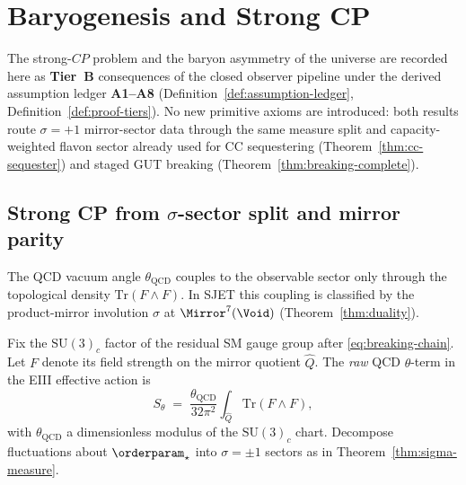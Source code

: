 \section{Baryogenesis and Strong CP}
\label{sec:baryogenesis}

The strong-$CP$ problem and the baryon asymmetry of the universe are
recorded here as \textbf{Tier~B} consequences of the closed observer pipeline
under the derived assumption ledger \textbf{A1--A8}
(Definition~\ref{def:assumption-ledger}, Definition~\ref{def:proof-tiers}).
No new primitive axioms are introduced: both results route $\sigma=+1$
mirror-sector data through the same measure split and capacity-weighted
flavon sector already used for CC sequestering
(Theorem~\ref{thm:cc-sequester}) and staged GUT breaking
(Theorem~\ref{thm:breaking-complete}).

\subsection{Strong CP from $\sigma$-sector split and mirror parity}
\label{sec:baryogenesis:strong-cp}

The QCD vacuum angle $\theta_{\mathrm{QCD}}$ couples to the observable sector
only through the topological density $\mathrm{Tr}(F\wedge F)$. In SJET this
coupling is classified by the product-mirror involution $\sigma$ at
$\Mirror^7(\Void)$ (Theorem~\ref{thm:duality}).

\begin{definition}\label{def:theta-qcd}
Fix the $\mathrm{SU}(3)_c$ factor of the residual SM gauge group after
\eqref{eq:breaking-chain}. Let $F$ denote its field strength on the mirror
quotient $\hat Q$. The \emph{raw} QCD $\theta$-term in the EIII effective
action is
\begin{equation}\label{eq:theta-raw}
  S_\theta
  \;=\;
  \frac{\theta_{\mathrm{QCD}}}{32\pi^2}
  \int_{\hat Q}
  \mathrm{Tr}(F\wedge F),
\end{equation}
with $\theta_{\mathrm{QCD}}$ a dimensionless modulus of the
$\mathrm{SU}(3)_c$ chart. Decompose fluctuations about $\orderparam_\star$
into $\sigma=\pm1$ sectors as in Theorem~\ref{thm:sigma-measure}.
\end{definition}

